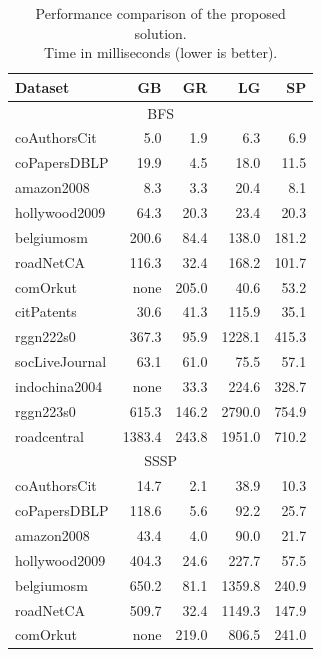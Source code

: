 \begin{table}[tbp]
\caption{Performance comparison of the proposed solution.\\Time in milliseconds (lower is better).} 
\begin{center}
    \begin{tabular}{|l|r|r|r|r|}
    \hline
    Dataset & GB & GR & LG & SP \\
    \hline
    \hline
    \multicolumn{5}{|c|}{BFS} \\
    \hline
    \rowcolor{black!10} coAuthorsCit&5.0&1.9&6.3&6.9\\
    \rowcolor{black!2 } coPapersDBLP&19.9&4.5&18.0&11.5\\
    \rowcolor{black!10} amazon2008&8.3&3.3&20.4&8.1\\
    \rowcolor{black!2 } hollywood2009&64.3&20.3&23.4&20.3\\
    \rowcolor{black!10} belgiumosm&200.6&84.4&138.0&181.2\\
    \rowcolor{black!2 } roadNetCA&116.3&32.4&168.2&101.7\\
    \rowcolor{black!10} comOrkut& none&205.0&40.6&53.2\\
    \rowcolor{black!2 } citPatents&30.6&41.3&115.9&35.1\\
    \rowcolor{black!10} rggn222s0&367.3&95.9&1228.1&415.3\\
    \rowcolor{black!2 } socLiveJournal&63.1&61.0&75.5&57.1\\
    \rowcolor{black!10} indochina2004& none&33.3&224.6&328.7\\
    \rowcolor{black!2 } rggn223s0&615.3&146.2&2790.0&754.9\\
    \rowcolor{black!10} roadcentral&1383.4&243.8&1951.0&710.2\\
    \hline
    \hline
    \multicolumn{5}{|c|}{SSSP} \\
    \hline
    \rowcolor{black!10} coAuthorsCit&14.7&2.1&38.9&10.3\\
    \rowcolor{black!2 } coPapersDBLP&118.6&5.6&92.2&25.7\\
    \rowcolor{black!10} amazon2008&43.4&4.0&90.0&21.7\\
    \rowcolor{black!2 } hollywood2009&404.3&24.6&227.7&57.5\\
    \rowcolor{black!10} belgiumosm&650.2&81.1&1359.8&240.9\\
    \rowcolor{black!2 } roadNetCA&509.7&32.4&1149.3&147.9\\
    \rowcolor{black!10} comOrkut& none&219.0&806.5&241.0\\

\end{tabular}
\end{center}
\end{table}
